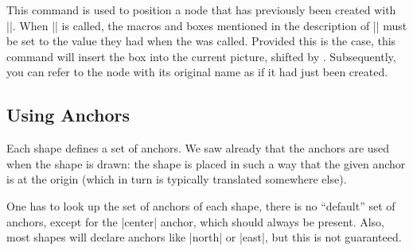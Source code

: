 \begin{command}{\pgfpositionnodenow{}}
  This command is used to position a node that has previously been
  created with |\pgfpositionnodelater|. When |\pgfpositionnodenow| is
  called, the macros and boxes mentioned in the description of
  |\pgfpositionnodenow| must be set to the value they had when the
   was called. Provided this is the case, this
  command will insert the box into the current picture, shifted by
  . Subsequently, you can refer to the node with its
  original name as if it had just been created.

  \begin{codeexample}[]
\newbox\mybox

\def\mysaver{
  \global\setbox\mybox=\box\pgfpositionnodelaterbox
  \global\let\myname=\pgfpositionnodelatername
  \global\let\myminx=\pgfpositionnodelaterminx
  \global\let\myminy=\pgfpositionnodelaterminy
  \global\let\mymaxx=\pgfpositionnodelatermaxx
  \global\let\mymaxy=\pgfpositionnodelatermaxy
}

  \end{codeexample}
\end{command}


\subsection{Using Anchors}

Each shape defines a set of anchors. We saw already that the anchors
are used when the shape is drawn: the shape is placed in such a way
that the given anchor is at the origin (which in turn is typically
translated somewhere else).

One has to look up the set of anchors of each shape, there is no
``default'' set of anchors, except for the |center| anchor, which
should always be present. Also, most shapes will declare anchors like
|north| or |east|, but this is not guaranteed.


